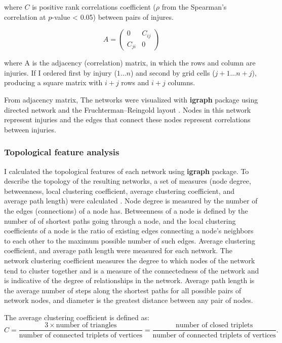 where $C$ is positive rank correlations coefficient ($\rho$ from the Spearman’s correlation at $p$-value < 0.05) between pairs of injures.

\begin{equation}
A = \begin{pmatrix}
0 & C_{ij}\\ 
C_{ji} & 0
\end{pmatrix}
\end{equation}

where A is the adjacency (correlation) matrix, in which the rows and column are injuries. If I ordered first by injury ($1\dots n$) and second by grid cells ($j + 1\dots n + j$), producing a square matrix with $i + j$ rows and $i + j$ columns.

From adjacency matrix, The networks were visualized with \textbf{igraph} package \citep{Csardi_2010_igraph} using directed network and the Fruchterman–Reingold layout \citep{Fruchterman_1991_Graph}. Nodes in this network represent injuries and the edges that connect these nodes represent correlations between injuries.
\subsubsection{Topological feature analysis}

I calculated the topological features of each network using \textbf{igraph} package. To describe the topology of the resulting networks, a set of measures (node degree, betweenness, local clustering coefficient, average clustering coefficient, and average path length) were calculated \citep{Newman_2006_Modularity}. Node degree is measured by the number of the edges (connections) of a node has. Betweenness of a node is defined by the number of of shortest paths going through a node, and the local clustering coefficients of a node is the ratio of existing edges connecting a node's neighbors to each other to the maximum possible number of such edges. Average clustering coefficient, and average path length were measured for each network. The network clustering coefficient measures the degree to which nodes of the network tend to cluster together and is a measure of the connectedness of the network and is indicative of the degree of relationships in the network. Average path length is the average number of steps along the shortest paths for all possible pairs of network nodes, and diameter is the greatest distance between any pair of nodes. 

The average clustering coefficient is defined as:
\begin{equation}
C = \frac{3 \times \mbox{number of triangles}}{\mbox{number of connected triplets of vertices}} = \frac{\mbox{number of closed triplets}}{\mbox{number of connected triplets of vertices}}.
\end{equation}

